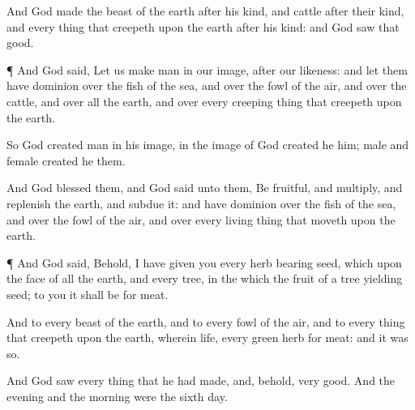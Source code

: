 {And
God
made the
beast of the
earth after his
kind, and
cattle after their
kind, and every thing that
creepeth upon the
earth after his
kind: and
God
saw that
{}
good.


\par }{\PP {}¶ And
God
said, Let us
make
man in our
image, after our
likeness: and let them have
dominion over the
fish of the
sea, and over the
fowl of the
air, and over the
cattle, and over all the
earth, and over every creeping
thing that
creepeth upon the
earth.

So
God
created
man in his
{}
image, in the
image of
God
created he him;
male and
female
created he them.

And
God
blessed them, and
God
said unto them, Be
fruitful, and
multiply, and
replenish the
earth, and subdue
it: and have
dominion over the
fish of the
sea, and over the
fowl of the
air, and over every living
thing that
moveth upon the
earth.


\par }{\PP {}¶ And
God
said,
Behold, I have
given you every
herb
bearing
seed, which
{} upon the
face of all the
earth, and every
tree, in the which
{} the
fruit of a
tree
yielding
seed; to you it shall
be for
meat.

And to every
beast of the
earth, and to every
fowl of the
air, and to every thing that
creepeth upon the
earth, wherein
{}
life,
{} every
green
herb for
meat: and it was so.

And
God
saw every thing
that he had
made, and, behold,
{}
very
good. And the
evening and the
morning were the
sixth
day.




\par }
